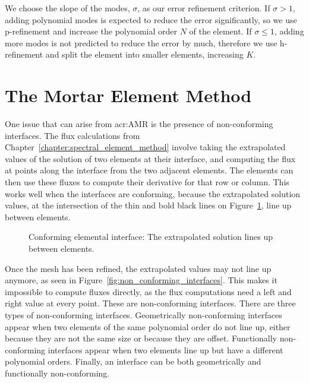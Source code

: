 We choose the slope of the modes, \(\sigma \), as our error refinement criterion. If \(\sigma > 1\),
adding polynomial modes is expected to reduce the error significantly, so we use p-refinement and
increase the polynomial order \(N\) of the element. If \(\sigma \leqslant 1\), adding more modes is
not predicted to reduce the error by much, therefore we use h-refinement and split the element into
smaller elements, increasing \(K\).

\section{The Mortar Element Method}\label{section:adaptive_mesh_refinement:mortar_element_method}

One issue that can arise from \acrshort{acr:AMR} is the presence of non-conforming interfaces. The
flux calculations from Chapter~\ref{chapter:spectral_element_method} involve taking the extrapolated
values of the solution of two elements at their interface, and computing the flux at points along
the interface from the two adjacent elements. The elements can then use these fluxes to compute
their derivative for that row or column. This works well when the interfaces are conforming, because
the extrapolated solution values, at the intersection of the thin and bold black lines on
Figure~\ref{fig:conforming_interfaces}, line up between elements.

\begin{figure}[H]
    \centering
    
    \caption{Conforming elemental interface: The extrapolated solution lines up between elements.}\label{fig:conforming_interfaces}
\end{figure}

Once the mesh has been refined, the extrapolated values may not line up anymore, as seen in
Figure~\ref{fig:non_conforming_interfaces}. This makes it impossible to compute fluxes directly, as
the flux computations need a left and right value at every point. These are non-conforming
interfaces. There are three types of non-conforming interfaces. Geometrically non-conforming
interfaces appear when two elements of the same polynomial order do not line up, either because they
are not the same size or because they are offset. Functionally non-conforming interfaces appear when
two elements line up but have a different polynomial orders. Finally, an interface can be both
geometrically and functionally non-conforming.

